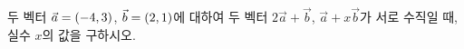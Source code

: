 두 벡터 $\vec{a}=(-4{,}\mkern3mu\mathopen{}3)$, $\vec{b}=(2{,}\mkern3mu\mathopen{}1)$에 대하여 두 벡터 $2\vec{a}+\vec{b}$, $\vec{a}+x\vec{b}$가 서로 수직일 때, 실수 $x$의 값을 구하시오.
